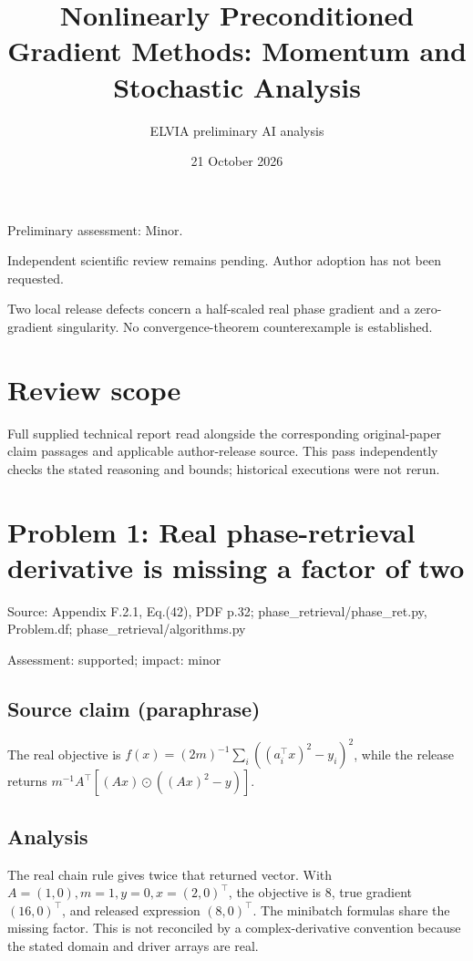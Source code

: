 \documentclass[11pt]{article}
\begin{document}
\title{Nonlinearly Preconditioned Gradient Methods: Momentum and Stochastic Analysis}

\author{ELVIA preliminary AI analysis}\date{21 October 2026}\maketitle

Preliminary assessment: Minor.\par

Independent scientific review remains pending. Author adoption has not been requested.

Two local release defects concern a half-scaled real phase gradient and a zero-gradient singularity. No convergence-theorem counterexample is established.

\section*{Review scope}

Full supplied technical report read alongside the corresponding original-paper claim passages and applicable author-release source. This pass independently checks the stated reasoning and bounds; historical executions were not rerun.

\section*{Problem 1: Real phase-retrieval derivative is missing a factor of two}

Source: Appendix F.2.1, Eq.(42), PDF p.32; phase\_retrieval/phase\_ret.py, Problem.df; phase\_retrieval/algorithms.py

Assessment: supported; impact: minor

\subsection*{Source claim (paraphrase)}

The real objective is \(f(x)=(2m)^{-1}\sum_i((a_i^\top x)^2-y_i)^2\), while the release returns \(m^{-1}A^\top[(Ax)\odot((Ax)^2-y)]\).

\subsection*{Analysis}

The real chain rule gives twice that returned vector. With \(A=(1,0),m=1,y=0,x=(2,0)^\top\), the objective is \(8\), true gradient \((16,0)^\top\), and released expression \((8,0)^\top\). The minibatch formulas share the missing factor. This is not reconciled by a complex-derivative convention because the stated domain and driver arrays are real.
\end{document}
